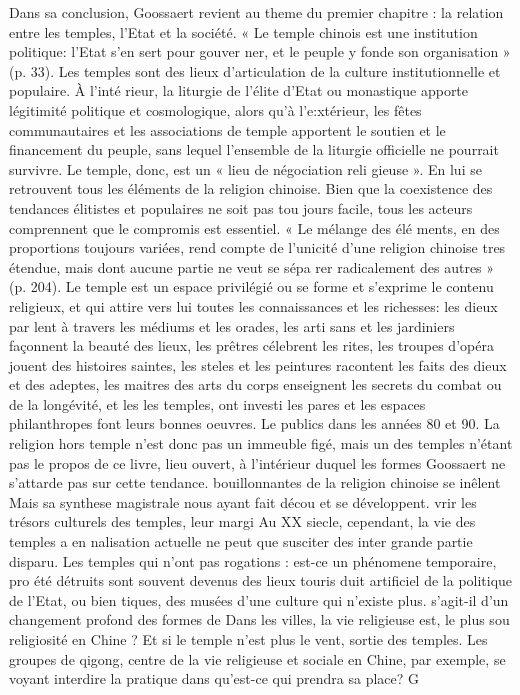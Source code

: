 Dans sa conclusion, Goossaert revient au theme du premier chapitre : la relation entre les temples, l'Etat et la société. « Le temple chinois est une institution politique: l'Etat s'en sert pour gouver  ner, et le peuple y fonde son organisation » (p. 33). Les temples sont des lieux d'articulation de la culture institutionnelle et populaire. À l'inté  rieur, la liturgie de l'élite d'Etat ou monastique apporte légitimité politique et cosmologique, alors qu'à l'e:xtérieur, les fêtes communautaires et les associations de temple apportent le soutien et le financement du peuple, sans lequel l'ensemble de la liturgie officielle ne pourrait survivre. Le temple, donc, est un « lieu de négociation reli  gieuse ». En lui se retrouvent tous les éléments de la religion chinoise. Bien que la coexistence des tendances élitistes et populaires ne soit pas tou  jours facile, tous les acteurs comprennent que le compromis est essentiel. « Le mélange des élé  ments, en des proportions toujours variées, rend compte de l'unicité d'une religion chinoise tres étendue, mais dont aucune partie ne veut se sépa  rer radicalement des autres » (p. 204). Le temple est un espace privilégié ou se forme et s'exprime le contenu religieux, et qui attire vers lui toutes les connaissances et les richesses: les dieux par  lent à travers les médiums et les orades, les arti  sans et les jardiniers façonnent la beauté des lieux, les prêtres célebrent les rites, les troupes d'opéra jouent des histoires saintes, les steles et les peintures racontent les faits des dieux et des adeptes, les maitres des arts du corps enseignent
les secrets du combat ou de la longévité, et les les temples, ont investi les pares et les espaces philanthropes font leurs bonnes oeuvres. Le publics dans les années 80 et 90. La religion hors temple n'est donc pas un immeuble figé, mais un des temples n'étant pas le propos de ce livre, lieu ouvert, à l'intérieur duquel les formes Goossaert ne s'attarde pas sur cette tendance. bouillonnantes de la religion chinoise se inêlent Mais sa synthese magistrale nous ayant fait décou  et se développent.	vrir les trésors culturels des temples, leur margi  Au XX siecle, cependant, la vie des temples a en nalisation actuelle ne peut que susciter des inter  grande partie disparu. Les temples qui n'ont pas rogations : est-ce un phénomene temporaire, pro  été détruits sont souvent devenus des lieux touris  duit artificiel de la politique de l'Etat, ou bien tiques, des musées d'une culture qui n'existe plus. s'agit-il d'un changement profond des formes de Dans les villes, la vie religieuse est, le plus sou   religiosité en Chine ? Et si le temple n'est plus le vent, sortie des temples. Les groupes de qigong, centre de la vie religieuse et sociale en Chine, par exemple, se voyant interdire la pratique dans  qu'est-ce qui prendra sa place? G


